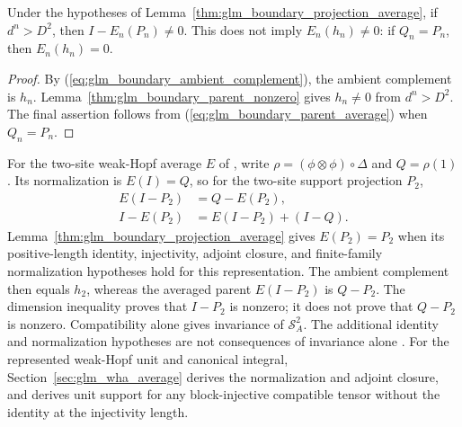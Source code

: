 \begin{lemma}
    \label{thm:glm_boundary_average_nonzero}
    \leanok
    Under the hypotheses of
    Lemma~\ref{thm:glm_boundary_projection_average}, if $d^n>D^2$,
    then $I-E_n(P_n)\ne0$. This does not imply $E_n(h_n)\ne0$:
    if $Q_n=P_n$, then $E_n(h_n)=0$.
\end{lemma}
\begin{proof}
    \leanok
    By (\ref{eq:glm_boundary_ambient_complement}), the ambient complement
    is $h_n$. Lemma~\ref{thm:glm_boundary_parent_nonzero} gives
    $h_n\ne0$ from $d^n>D^2$. The final assertion follows from
    (\ref{eq:glm_boundary_parent_average}) when $Q_n=P_n$.
\end{proof}

For the two-site weak-Hopf average $E$ of
\cite[Appendix~B]{GarreRubio2023MPOSym}, write
$\rho=(\phi\otimes\phi)\circ\Delta$ and $Q=\rho(1)$.
Its normalization is $E(I)=Q$, so for the two-site support projection $P_2$,
\begin{align}
    E(I-P_2) & =Q-E(P_2),
    \label{eq:glm_parent_wha_average} \\
    I-E(P_2) & =E(I-P_2)+(I-Q).
    \label{eq:glm_parent_wha_complement}
\end{align}
Lemma~\ref{thm:glm_boundary_projection_average} gives $E(P_2)=P_2$
when its positive-length identity, injectivity, adjoint closure, and
finite-family normalization hypotheses hold for this representation.
The ambient complement then equals $h_2$, whereas the averaged
parent $E(I-P_2)$ is $Q-P_2$. The dimension inequality proves that $I-P_2$ is nonzero;
it does not prove that $Q-P_2$ is nonzero. Compatibility alone gives
invariance of $\mathcal S_A^2$. The additional identity and normalization
hypotheses are not consequences of invariance alone
\cite{gap:glm23_wha_parent_completion}. For the represented weak-Hopf unit
and canonical integral, Section~\ref{sec:glm_wha_average} derives the
normalization and adjoint closure, and derives unit support for any
block-injective compatible tensor without the identity at the injectivity
length.
